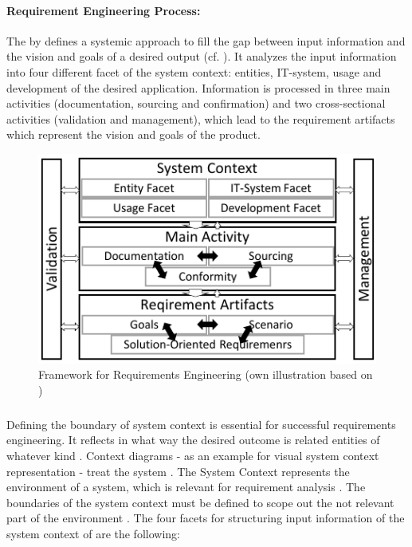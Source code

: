 \paragraph{Requirement Engineering Process:} The by \textcite{Pohl.2007} defines a systemic approach to fill the gap between input information and the vision and goals of a desired output (cf. ). It analyzes the input information into four different facet of the system context: entities, IT-system, usage and development of the desired application. Information is processed in three main activities (documentation, sourcing and confirmation) and two cross-sectional activities (validation and management), which lead to the requirement artifacts which represent the vision and goals of the product. \parencite[cf.][38-39]{Pohl.2007}
\begin{figure}[H]
    \centering
    \includegraphics[scale=1.5]{img/ReqAnFrameWork.pdf}
    \caption[Framework for Requirements Engineering]{Framework for Requirements Engineering (own illustration based on \cite[41]{Pohl.2007})}
    \label{fig:reqFramework}
\end{figure}
\subparagraph{} Defining the boundary of system context is essential for successful requirements engineering. It reflects in what way the desired outcome is related entities of whatever kind \parencite[55]{Pohl.2007}. Context diagrams \parencites[cf.][266]{Kossiakoff.2011} - as an example for visual system context representation - treat the system  \parencite[76]{Lauesen.2008}. The System Context represents the environment of a system, which is relevant for requirement analysis \parencite[55]{Pohl.2007}. The boundaries of the system context must be defined to scope out the not relevant part of the environment \parencite[55-56]{Pohl.2007}. The four facets for structuring input information of the system context of \textcite{Pohl.2007} are the following:
